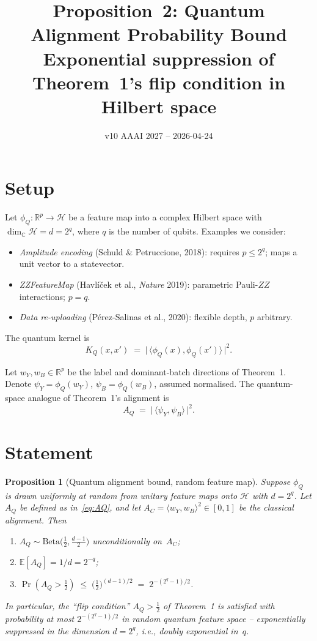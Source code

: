 \documentclass[11pt,a4paper]{article}
\title{Proposition~2: Quantum Alignment Probability Bound\\
\large Exponential suppression of Theorem~1's flip condition in Hilbert space}
\date{v10 AAAI 2027 -- 2026-04-24}
\newtheorem{proposition}{Proposition}
\newcommand{\R}{\mathbb{R}}
\newcommand{\C}{\mathbb{C}}
\newcommand{\E}{\mathbb{E}}
\begin{document}
\maketitle

\section{Setup}

Let $\phi_Q:\R^p\to\mathcal{H}$ be a feature map into a complex
Hilbert space with $\dim_\C\mathcal{H}=d=2^{q}$, where $q$ is the
number of qubits. Examples we consider:
\begin{itemize}
\item \emph{Amplitude encoding} (Schuld \& Petruccione, 2018):
  requires $p\le 2^{q}$; maps a unit vector to a statevector.
\item \emph{ZZFeatureMap} (Havlíček et al., \emph{Nature} 2019):
  parametric Pauli-$ZZ$ interactions; $p=q$.
\item \emph{Data re-uploading} (P\'erez-Salinas et al., 2020):
  flexible depth, $p$ arbitrary.
\end{itemize}
The quantum kernel is
\[
  K_Q(x,x') \;=\; \bigl|\,\langle\phi_Q(x),\phi_Q(x')\rangle\,\bigr|^{2}.
\]

Let $w_Y,w_B\in\R^{p}$ be the label and dominant-batch directions of
Theorem~1. Denote $\psi_Y=\phi_Q(w_Y)$, $\psi_B=\phi_Q(w_B)$, assumed
normalised. The quantum-space analogue of Theorem~1's alignment is
\begin{equation}
  A_Q \;=\; \bigl|\,\langle\psi_Y,\psi_B\rangle\,\bigr|^{2}.
  \label{eq:AQ}
\end{equation}

\section{Statement}

\begin{proposition}[Quantum alignment bound, random feature map]
\label{prop:quantum}
Suppose $\phi_Q$ is drawn uniformly at random from unitary feature maps
onto $\mathcal{H}$ with $d=2^{q}$. Let $A_Q$ be defined as
in~\eqref{eq:AQ}, and let $A_C=\langle w_Y,w_B\rangle^{2}\in[0,1]$ be
the classical alignment. Then
\begin{enumerate}
\item[\textup{(i)}] $A_Q\sim\mathrm{Beta}\bigl(\tfrac12,\tfrac{d-1}{2}\bigr)$
  unconditionally on~$A_C$;
\item[\textup{(ii)}] $\E[A_Q]=1/d=2^{-q}$;
\item[\textup{(iii)}] $\Pr(A_Q>\tfrac12)\;\le\;\bigl(\tfrac12\bigr)^{(d-1)/2}\;=\;2^{-(2^{q}-1)/2}$.
\end{enumerate}
In particular, the ``flip condition'' $A_Q>\tfrac12$ of Theorem~1 is
satisfied with probability at most $2^{-(2^{q}-1)/2}$ in random quantum
feature space -- exponentially suppressed in the \emph{dimension}
$d=2^{q}$, i.e., doubly exponential in~$q$.
\end{proposition}
\end{document}
